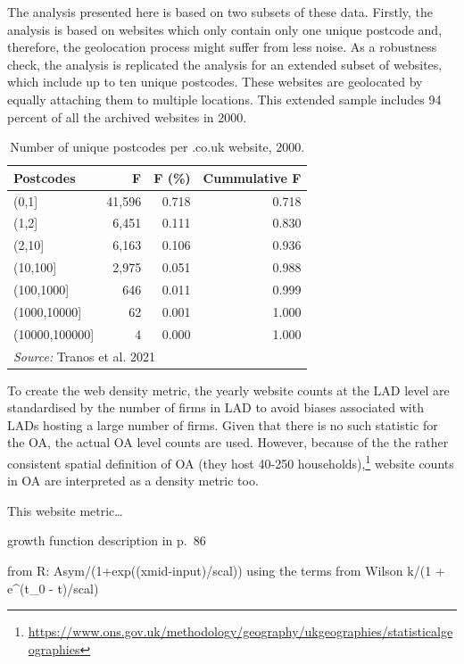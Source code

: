 \documentclass[
  authoryear,
  preprint,
  3p]{elsarticle}
\begin{document}
The analysis presented here is based on two subsets of these data.
Firstly, the analysis is based on websites which only contain only one
unique postcode and, therefore, the geolocation process might suffer
from less noise. As a robustness check, the analysis is replicated the
analysis for an extended subset of websites, which include up to ten
unique postcodes. These websites are geolocated by equally attaching
them to multiple locations. This extended sample includes 94 percent of
all the archived websites in 2000.

\begin{table}

\caption{\label{tab:unnamed-chunk-1}Number of unique postcodes per .co.uk website, 2000.\label{f2000}}
\centering
\begin{tabular}[t]{lrrr}
\toprule
Postcodes & F & F (\%) & Cummulative F\\
\midrule
(0,1] & 41,596 & 0.718 & 0.718\\
(1,2] & 6,451 & 0.111 & 0.830\\
(2,10] & 6,163 & 0.106 & 0.936\\
(10,100] & 2,975 & 0.051 & 0.988\\
(100,1000] & 646 & 0.011 & 0.999\\
\addlinespace
(1000,10000] & 62 & 0.001 & 1.000\\
(10000,100000] & 4 & 0.000 & 1.000\\
\bottomrule
\multicolumn{4}{l}{\rule{0pt}{1em}\textit{Source: } Tranos et al. 2021}\\
\end{tabular}
\end{table}

To create the web density metric, the yearly website counts at the LAD
level are standardised by the number of firms in LAD to avoid biases
associated with LADs hosting a large number of firms. Given that there
is no such statistic for the OA, the actual OA level counts are used.
However, because of the the rather consistent spatial definition of OA
(they host 40-250 households),\footnote{\url{https://www.ons.gov.uk/methodology/geography/ukgeographies/statisticalgeographies}}
website counts in OA are interpreted as a density metric too.

This website metric\ldots{}

\citet{wilson201281} growth function description in p.~86

from R: Asym/(1+exp((xmid-input)/scal)) using the terms from Wilson k/(1
+ e\^{}(t\_0 - t)/scal)
\end{document}
